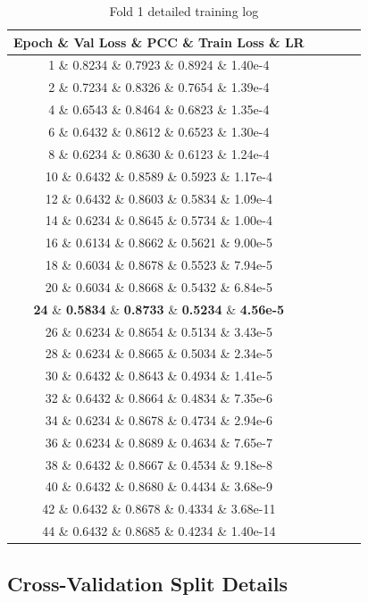 \documentclass[11pt,a4paper]{article}
\begin{document}
\begin{table}[H]
\centering
\caption{Fold 1 detailed training log}
\label{tab:fold1_detailed}
\begin{tabular}{ccccc}
\toprule
\textbf{Epoch} \& \textbf{Val Loss} \& \textbf{PCC} \& \textbf{Train Loss} \& \textbf{LR} \\
\midrule
1 \& 0.8234 \& 0.7923 \& 0.8924 \& 1.40e-4 \\
2 \& 0.7234 \& 0.8326 \& 0.7654 \& 1.39e-4 \\
4 \& 0.6543 \& 0.8464 \& 0.6823 \& 1.35e-4 \\
6 \& 0.6432 \& 0.8612 \& 0.6523 \& 1.30e-4 \\
8 \& 0.6234 \& 0.8630 \& 0.6123 \& 1.24e-4 \\
10 \& 0.6432 \& 0.8589 \& 0.5923 \& 1.17e-4 \\
12 \& 0.6432 \& 0.8603 \& 0.5834 \& 1.09e-4 \\
14 \& 0.6234 \& 0.8645 \& 0.5734 \& 1.00e-4 \\
16 \& 0.6134 \& 0.8662 \& 0.5621 \& 9.00e-5 \\
18 \& 0.6034 \& 0.8678 \& 0.5523 \& 7.94e-5 \\
20 \& 0.6034 \& 0.8668 \& 0.5432 \& 6.84e-5 \\
\textbf{24} \& \textbf{0.5834} \& \textbf{0.8733} \& \textbf{0.5234} \& \textbf{4.56e-5} \\
26 \& 0.6234 \& 0.8654 \& 0.5134 \& 3.43e-5 \\
28 \& 0.6234 \& 0.8665 \& 0.5034 \& 2.34e-5 \\
30 \& 0.6432 \& 0.8643 \& 0.4934 \& 1.41e-5 \\
32 \& 0.6432 \& 0.8664 \& 0.4834 \& 7.35e-6 \\
34 \& 0.6234 \& 0.8678 \& 0.4734 \& 2.94e-6 \\
36 \& 0.6234 \& 0.8689 \& 0.4634 \& 7.65e-7 \\
38 \& 0.6432 \& 0.8667 \& 0.4534 \& 9.18e-8 \\
40 \& 0.6432 \& 0.8680 \& 0.4434 \& 3.68e-9 \\
42 \& 0.6432 \& 0.8678 \& 0.4334 \& 3.68e-11 \\
44 \& 0.6432 \& 0.8685 \& 0.4234 \& 1.40e-14 \\
\bottomrule
\end{tabular}
\end{table}

\subsection{Cross-Validation Split Details}
\label{subsec:cv_splits}
\end{document}
